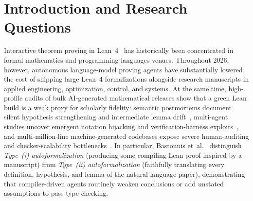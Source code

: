 \documentclass[11pt,letterpaper]{article}
\begin{document}
\section{Introduction and Research Questions}
\label{sec:intro}

Interactive theorem proving in Lean~4~\cite{demoura2021lean4} has historically been concentrated in formal mathematics and programming-languages venues. Throughout 2026, however, autonomous language-model proving agents have substantially lowered the cost of shipping large Lean~4 formalizations alongside research manuscripts in applied engineering, optimization, control, and systems. At the same time, high-profile audits of bulk AI-generated mathematical releases show that a green Lean build is a weak proxy for scholarly fidelity: semantic postmortems document silent hypothesis strengthening and intermediate lemma drift~\cite{bastounis2026navier,leanatlas2026}, multi-agent studies uncover emergent notation hijacking and verification-harness exploits~\cite{paglieri2026swarms}, and multi-million-line machine-generated codebases expose severe human-auditing and checker-scalability bottlenecks~\cite{axle2026}. In particular, Bastounis et~al.~\cite{bastounis2026navier} distinguish \emph{Type~(i) autoformalization} (producing some compiling Lean proof inspired by a manuscript) from \emph{Type~(ii) autoformalization} (faithfully translating every definition, hypothesis, and lemma of the natural-language paper), demonstrating that compiler-driven agents routinely weaken conclusions or add unstated assumptions to pass type checking.
\end{document}
